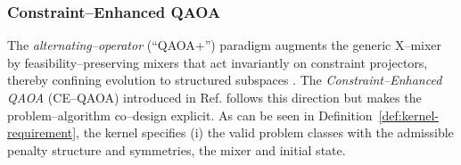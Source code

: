 \documentclass[a4paper,onecolumn,11pt,unpublished]{quantumarticle}
\theoremstyle{remark}
\begin{document}
\subsubsection{Constraint–Enhanced QAOA}
\label{sec:ce-qaoa}

The \emph{alternating–operator} (``QAOA+'') paradigm augments the generic X–mixer
by feasibility–preserving mixers that act invariantly on constraint projectors,
thereby confining evolution to structured subspaces
\cite{Hadfield2019AOA,Fuchs2022ConstrainedMixers}. The
\emph{Constraint–Enhanced QAOA} (CE–QAOA) introduced in Ref. \cite{onahce} follows this direction but makes the problem–algorithm co–design explicit. As can be seen in Definition~\ref{def:kernel-requirement}, the kernel specifies (i) the valid problem classes with the admissible penalty structure and symmetries, the mixer and initial
state.

\end{document}
